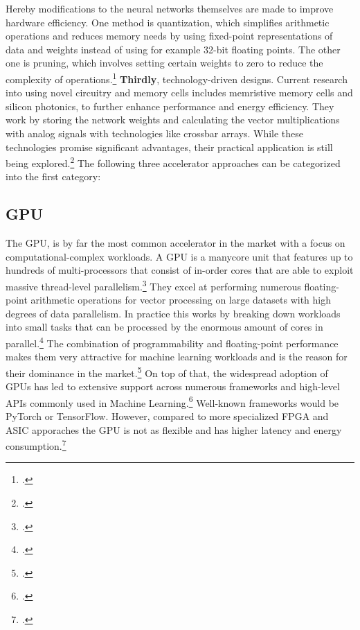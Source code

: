 Hereby modifications to the neural networks themselves are made to improve hardware efficiency.
One method is quantization, which simplifies arithmetic operations and reduces memory needs by using fixed-point representations of data and weights instead of using for example 32-bit floating points.
The other one is pruning, which involves setting certain weights to zero to reduce the complexity of operations.\footcite[cf.][3883]{lehnertMostResourceEfficient2023}
\textbf{Thirdly}, technology-driven designs.
Current research into using novel circuitry and memory cells includes memristive memory cells and silicon photonics, to further enhance performance and energy efficiency.
They work by storing the network weights and calculating the vector multiplications with analog signals with technologies like crossbar arrays.
While these technologies promise significant advantages, their practical application is still being explored.\footcite[cf.][3883]{lehnertMostResourceEfficient2023}
The following three accelerator approaches can be categorized into the first category:

\subsection{GPU}
The \ac{GPU}, is by far the most common accelerator in the market with a focus on computational-complex workloads.
A \ac{GPU} is a manycore unit that features up to hundreds of multi-processors that consist of in-order cores that are able to exploit massive thread-level parallelism.\footcite[cf.][2]{peccerilloSurveyHardwareAccelerators2022}
They excel at performing numerous floating-point arithmetic operations for vector processing on large datasets with high degrees of data parallelism.
In practice this works by breaking down workloads into small tasks that can be processed by the enormous amount of cores in parallel.\footcite[cf.][101]{huSurveyConvolutionalNeural2022} 
The combination of programmability and floating-point performance
makes them very attractive for machine learning workloads and is the reason for their dominance in the market.\footcite[cf.][42]{dallyEvolutionGraphicsProcessing2021}
On top of that, the widespread adoption of \ac{GPU}s has led to extensive support across numerous frameworks and high-level APIs commonly used in Machine Learning.\footcite[cf.][16]{baischerLearningHardwareTutorial2021}
Well-known frameworks would be PyTorch or TensorFlow.
However, compared to more specialized \ac{FPGA} and \ac{ASIC} apporaches the \ac{GPU} is not as flexible and has higher latency and energy consumption.\footcite[cf.][100]{huSurveyConvolutionalNeural2022}

